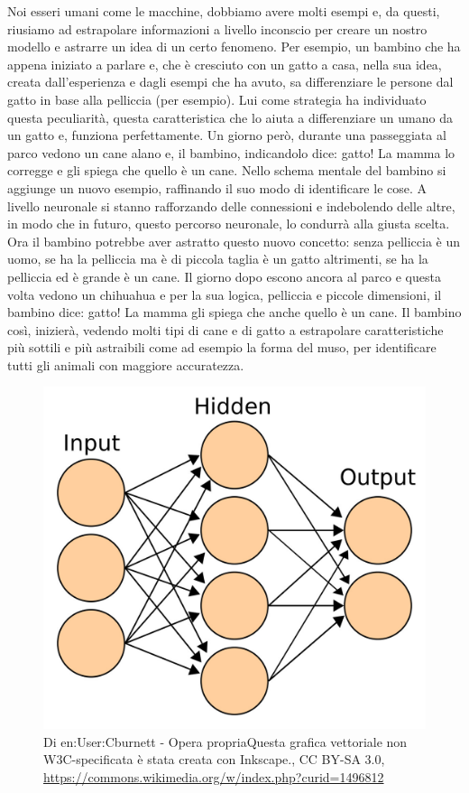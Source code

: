 \documentclass[12pt]{book} %
\begin{document}
Noi esseri umani come le macchine, dobbiamo avere molti esempi e, da questi, riusiamo ad estrapolare informazioni a
livello inconscio per creare un nostro modello e astrarre un idea di un certo fenomeno. Per esempio, un bambino che ha
appena iniziato a parlare e, che è cresciuto con un gatto a casa, nella sua idea, creata
dall'esperienza e dagli esempi che ha avuto, sa differenziare le persone dal gatto in base alla
pelliccia (per esempio). Lui come strategia ha individuato questa peculiarità, questa caratteristica che lo aiuta a
differenziare un umano da un gatto e, funziona perfettamente. Un giorno però, durante una passeggiata al parco vedono
un cane alano e, il bambino, indicandolo dice: gatto! La mamma lo corregge e gli spiega che quello è un cane. Nello
schema mentale del bambino si aggiunge un nuovo esempio, raffinando il suo modo di identificare le cose. A livello
neuronale si stanno rafforzando delle connessioni e indebolendo delle altre, in modo che in futuro, questo percorso
neuronale, lo condurrà alla giusta scelta. Ora il bambino potrebbe aver astratto questo nuovo concetto: senza pelliccia
è un uomo, se ha la pelliccia ma è di piccola taglia è un gatto altrimenti, se ha la pelliccia ed è grande è un cane.
Il giorno dopo escono ancora al parco e questa volta vedono un chihuahua e per la sua logica, pelliccia e piccole
dimensioni, il bambino dice: gatto! La mamma gli spiega che anche quello è un cane. Il bambino così, inizierà, vedendo
molti tipi di cane e di gatto a estrapolare caratteristiche più sottili e più astraibili come ad esempio la forma del
muso, per identificare tutti gli animali con maggiore accuratezza.

\begin{figure}
  \centering
  \includegraphics[width=0.95\linewidth]{images/Libro-img049.jpg}
  \begin{minipage}{\linewidth}
    \caption{Di en:User:Cburnett - Opera propriaQuesta grafica
vettoriale non W3C-specificata è stata creata con Inkscape., CC BY-SA 3.0,
\protect\url{https://commons.wikimedia.org/w/index.php?curid=1496812} }
  \end{minipage}
\end{figure}
\end{document}
